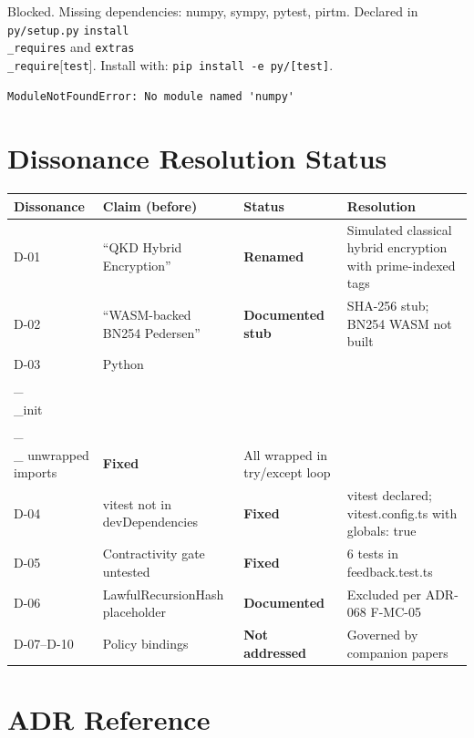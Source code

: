 \documentclass[11pt]{article}
\begin{document}
Blocked. Missing dependencies: numpy, sympy, pytest, pirtm.
Declared in \texttt{py/setup.py} \texttt{install\\_requires} and \texttt{extras\\_require}[\texttt{test}].
Install with: \texttt{pip install -e py/[test]}.

\begin{verbatim}
ModuleNotFoundError: No module named 'numpy'
\end{verbatim}

\section{Dissonance Resolution Status}

\begin{center}
\begin{longtable}{p{3.5cm} p{3.5cm} p{2cm} p{4cm}}
\toprule
\textbf{Dissonance} & \textbf{Claim (before)} & \textbf{Status} & \textbf{Resolution} \\
\midrule
\endhead
D-01 & ``QKD Hybrid Encryption'' & \textbf{Renamed} & Simulated classical hybrid encryption with prime-indexed tags \\
D-02 & ``WASM-backed BN254 Pedersen'' & \textbf{Documented stub} & SHA-256 stub; BN254 WASM not built \\
D-03 & Python \\_\\_init\\_\\_ unwrapped imports & \textbf{Fixed} & All wrapped in try/except loop \\
D-04 & vitest not in devDependencies & \textbf{Fixed} & vitest declared; vitest.config.ts with globals: true \\
D-05 & Contractivity gate untested & \textbf{Fixed} & 6 tests in feedback.test.ts \\
D-06 & LawfulRecursionHash placeholder & \textbf{Documented} & Excluded per ADR-068 F-MC-05 \\
D-07--D-10 & Policy bindings & \textbf{Not addressed} & Governed by companion papers \\
\bottomrule
\end{longtable}
\end{center}

\section{ADR Reference}
\end{document}
